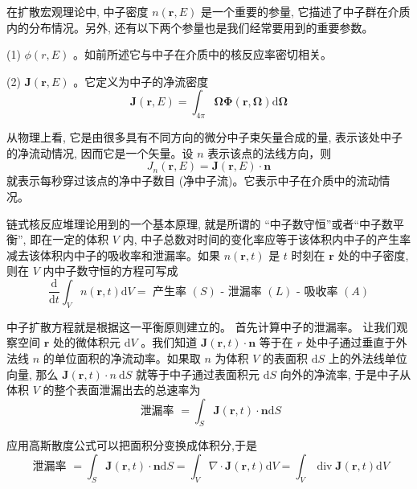 \documentclass{Sichuan Normal University}
\begin{document}
在扩散宏观理论中, 中子密度 $n(\boldsymbol{r}, E)$ 是一个重要的参量, 它描述了中子群在介质内的分布情况。另外, 还有以下两个参量也是我们经常要用到的重要参数。

(1) $\phi(r, E)$ 。如前所述它与中子在介质中的核反应率密切相关。

(2) $\boldsymbol{J}(\boldsymbol{r}, E)$ 。它定义为中子的净流密度
\begin{equation}
    \boldsymbol{J}(\boldsymbol{r}, E)=\int_{4 \pi} \boldsymbol{\Omega} \boldsymbol{\Phi}(\boldsymbol{r}, \boldsymbol{\Omega}) \mathrm{d} \boldsymbol{\Omega}
    \label{eq:中子的净流密度}
\end{equation}

从物理上看, 它是由很多具有不同方向的微分中子束矢量合成的量, 表示该处中子的净流动情况, 因而它是一个矢量。设 $n$ 表示该点的法线方向，则
\begin{equation}
    J_n(\boldsymbol{r}, E)=\boldsymbol{J}(\boldsymbol{r}, E) \cdot \boldsymbol{n}
    \label{eq:中子的净流密度2}
\end{equation}
就表示每秒穿过该点的净中子数目 (净中子流)。它表示中子在介质中的流动情况。

链式核反应堆理论用到的一个基本原理, 就是所谓的 “中子数守恒”或者“中子数平衡”, 即在一定的体积 $V$ 内, 中子总数对时间的变化率应等于该体积内中子的产生率减去该体积内中子的吸收率和泄漏率。如果 $n(\boldsymbol{r}, t)$ 是 $t$ 时刻在 $\boldsymbol{r}$ 处的中子密度, 则在 $V$ 内中子数守恒的方程可写成
\begin{equation}
    \frac{\mathrm{d}}{\mathrm{d} t} \int_V n(\boldsymbol{r}, t) \mathrm{d} V=\text { 产生率 }(S) \text { - 泄漏率 }(L) \text { - 吸收率 }(A)
    \label{eq:中子数守恒}
\end{equation}

中子扩散方程就是根据这一平衡原则建立的。
首先计算中子的泄漏率。
让我们观察空间 $\boldsymbol{r}$ 处的微体积元 $\mathrm{d} V$ 。我们知道 $\boldsymbol{J}(\boldsymbol{r}, t) \cdot \boldsymbol{n}$ 等于在 $r$ 处中子通过垂直于外法线 $n$ 的单位面积的净流动率。如果取 $n$ 为体积 $V$ 的表面积 $\mathrm{d} S$ 上的外法线单位向量, 那么 $\boldsymbol{J}(\boldsymbol{r}, t) \cdot n \mathrm{~d} S$ 就等于中子通过表面积元 $\mathrm{d} S$ 向外的净流率, 于是中子从体积 $V$ 的整个表面泄漏出去的总速率为
\begin{equation}
    \text { 泄漏率 }=\int_S \boldsymbol{J}(\boldsymbol{r}, t) \cdot \boldsymbol{n} \mathrm{d} S
    \label{eq:泄漏率}
\end{equation}

应用高斯散度公式可以把面积分变换成体积分,于是
\begin{equation}
    \text { 泄漏率 }=\int_S \boldsymbol{J}(\boldsymbol{r}, t) \cdot \boldsymbol{n} \mathrm{d} S=\int_V \nabla \cdot \boldsymbol{J}(\boldsymbol{r}, t) \mathrm{d} V=\int_V \operatorname{div} \boldsymbol{J}(\boldsymbol{r}, t) \mathrm{d} V
    \label{eq:泄漏率2}
\end{equation}
\end{document}
